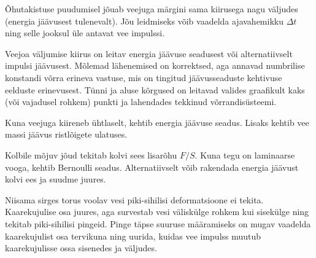 \documentclass[10pt, twoside]{article}
\begin{document}
{%

\hint
Õhutakistuse puudumisel jõuab veejuga märgini sama kiirusega nagu väljudes (energia jäävusest tulenevalt). Jõu leidmiseks võib vaadelda ajavahemikku $\Delta t$ ning selle jooksul üle antavat vee impulssi.
\probend
\bigskip


\hint
Veejoa väljumise kiirus on leitav energia jäävuse seadusest või alternatiivselt impulsi jäävusest. Mõlemad lähenemised on korrektsed, aga annavad numbrilise konstandi võrra erineva vastuse, mis on tingitud jäävusseaduste kehtivuse eelduste erinevusest. Tünni ja aluse kõrgused on leitavad valides graafikult kaks (või vajadusel rohkem) punkti ja lahendades tekkinud võrrandisüsteemi.
\probend
\bigskip


\hint
Kuna veejuga kiireneb ühtlaselt, kehtib energia jäävuse seadus. Lisaks kehtib vee massi jäävus ristlõigete ulatuses.
\probend
\bigskip


\hint
Kolbile mõjuv jõud tekitab kolvi sees lisarõhu $F/S$. Kuna tegu on laminaarse vooga, kehtib Bernoulli seadus. Alternatiivselt võib rakendada energia jäävust kolvi ees ja suudme juures.
\probend
\bigskip


\hint
Niisama sirges torus voolav vesi piki-sihilisi deformatsioone ei tekita. Kaarekujulise osa juures, aga survestab vesi väliskülge rohkem kui sisekülge ning tekitab piki-sihilisi pingeid. Pinge täpse suuruse määramiseks on mugav vaadelda kaarekujulist osa tervikuna ning uurida, kuidas vee impulss muutub kaarekujulisse ossa sisenedes ja väljudes.
\probend
\bigskip


}
\end{document}
